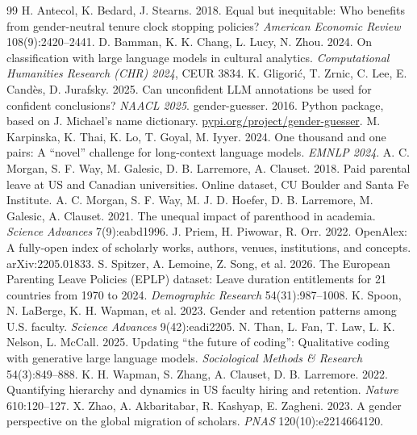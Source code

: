 \documentclass[10pt,twocolumn]{article}
\begin{document}
\small
\begin{thebibliography}{99}
 H. Antecol, K. Bedard, J. Stearns. 2018. Equal but inequitable: Who benefits from gender-neutral tenure clock stopping policies? \emph{American Economic Review} 108(9):2420--2441.
 D. Bamman, K. K. Chang, L. Lucy, N. Zhou. 2024. On classification with large language models in cultural analytics. \emph{Computational Humanities Research (CHR) 2024}, CEUR 3834.
 K. Gligori\'c, T. Zrnic, C. Lee, E. Cand\`es, D. Jurafsky. 2025. Can unconfident LLM annotations be used for confident conclusions? \emph{NAACL 2025}.
 gender-guesser. 2016. Python package, based on J. Michael's name dictionary. \url{pypi.org/project/gender-guesser}.
 M. Karpinska, K. Thai, K. Lo, T. Goyal, M. Iyyer. 2024. One thousand and one pairs: A ``novel'' challenge for long-context language models. \emph{EMNLP 2024}.
 A. C. Morgan, S. F. Way, M. Galesic, D. B. Larremore, A. Clauset. 2018. Paid parental leave at US and Canadian universities. Online dataset, CU Boulder and Santa Fe Institute.
 A. C. Morgan, S. F. Way, M. J. D. Hoefer, D. B. Larremore, M. Galesic, A. Clauset. 2021. The unequal impact of parenthood in academia. \emph{Science Advances} 7(9):eabd1996.
 J. Priem, H. Piwowar, R. Orr. 2022. OpenAlex: A fully-open index of scholarly works, authors, venues, institutions, and concepts. arXiv:2205.01833.
 S. Spitzer, A. Lemoine, Z. Song, et al. 2026. The European Parenting Leave Policies (EPLP) dataset: Leave duration entitlements for 21 countries from 1970 to 2024. \emph{Demographic Research} 54(31):987--1008.
 K. Spoon, N. LaBerge, K. H. Wapman, et al. 2023. Gender and retention patterns among U.S. faculty. \emph{Science Advances} 9(42):eadi2205.
 N. Than, L. Fan, T. Law, L. K. Nelson, L. McCall. 2025. Updating ``the future of coding'': Qualitative coding with generative large language models. \emph{Sociological Methods \& Research} 54(3):849--888.
 K. H. Wapman, S. Zhang, A. Clauset, D. B. Larremore. 2022. Quantifying hierarchy and dynamics in US faculty hiring and retention. \emph{Nature} 610:120--127.
 X. Zhao, A. Akbaritabar, R. Kashyap, E. Zagheni. 2023. A gender perspective on the global migration of scholars. \emph{PNAS} 120(10):e2214664120.
\end{thebibliography}
\onecolumn
\normalsize
\setlength{\parskip}{4pt}
\end{document}
